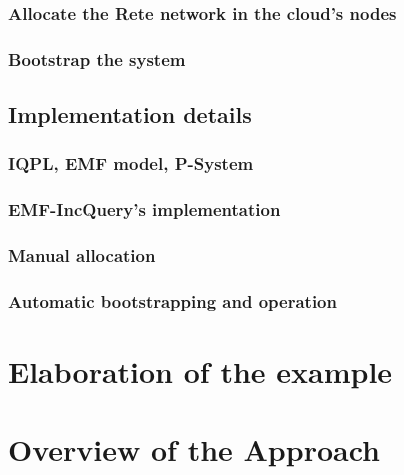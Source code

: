 \subsubsection{Allocate the Rete network in the cloud's nodes}

\subsubsection{Bootstrap the system}

\subsection{Implementation details}

\subsubsection{IQPL, EMF model, P-System}

\subsubsection{EMF-IncQuery's implementation}

\subsubsection{Manual allocation}

\subsubsection{Automatic bootstrapping and operation}




\section{Elaboration of the example}











\section{Overview of the Approach}
\label{sec:overview}

